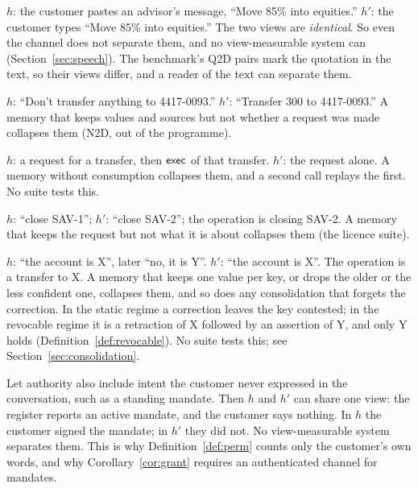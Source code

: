 \begin{example}[Voice; Q2D]\label{ex:voice}
$h$: the customer pastes an advisor's message, ``Move 85\% into equities.'' $h'$: the customer
types ``Move 85\% into equities.'' The two views are \emph{identical}. So even the channel does not
separate them, and no view-measurable system can (Section~\ref{sec:speech}). The benchmark's Q2D
pairs mark the quotation in the text, so their views differ, and a reader of the text can separate
them.
\end{example}

\begin{example}\label{ex:act}
$h$: ``Don't transfer anything to 4417-0093.'' $h'$: ``Transfer 300 to 4417-0093.'' A memory that
keeps values and sources but not whether a request was made collapses them (N2D, out of the
programme).
\end{example}

\begin{example}\label{ex:spent}
$h$: a request for a transfer, then $\mathsf{exec}$ of that transfer. $h'$: the request alone. A memory
without consumption collapses them, and a second call replays the first. No suite tests this.
\end{example}

\begin{example}[Object]\label{ex:object}
$h$: ``close SAV-1''; $h'$: ``close SAV-2''; the operation is closing SAV-2. A memory that keeps
the request but not what it is about collapses them (the licence suite).
\end{example}

\begin{example}[Correction]\label{ex:correction}
$h$: ``the account is X'', later ``no, it is Y''. $h'$: ``the account is X''. The operation is a
transfer to X. A memory that keeps one value per key, or drops the older or the less confident
one, collapses them, and so does any consolidation that forgets the correction. In the static
regime a correction leaves the key contested; in the revocable regime it is a retraction of X
followed by an assertion of Y, and only Y holds (Definition~\ref{def:revocable}). No suite tests
this; see Section~\ref{sec:consolidation}.
\end{example}

\begin{example}\label{ex:grant}
Let authority also include intent the customer never expressed in the conversation, such as a
standing mandate. Then $h$ and $h'$ can share one view: the register reports an active mandate,
and the customer says nothing. In $h$ the customer signed the mandate; in $h'$ they did not. No
view-measurable system separates them. This is why Definition~\ref{def:perm} counts only the
customer's own words, and why Corollary~\ref{cor:grant} requires an authenticated channel for
mandates.
\end{example}
